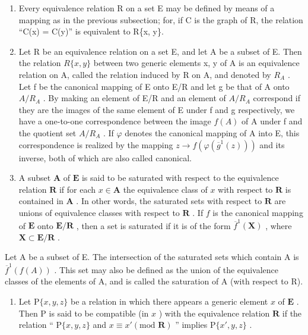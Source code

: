 \begin{enumerate}
\def\labelenumi{\arabic{enumi}.}
\setcounter{enumi}{3}
\item
  Every equivalence relation R on a set E may be defined by means of a mapping as in the previous subsection; for, if C is the graph of R, the relation ``C(x) = C(y)'' is equivalent to R\{x, y\}.
\item
  Let R be an equivalence relation on a set E, and let A be a subset of E. Then the relation \(R\{x, y\}\) between two generic elements x, y of A is an equivalence relation on A, called the relation induced by R on A, and denoted by \(R_{A}\) . Let f be the canonical mapping of E onto E/R and let g be that of A onto \(A/R_{A}\) . By making an element of E/R and an element of \(A/R_{A}\) correspond if they are the images of the same element of E under f and g respectively, we have a one-to-one correspondence between the image \(f(A)\) of A under f and the quotient set \(A/R_{A}\) . If \(\varphi\) denotes the canonical mapping of A into E, this correspondence is realized by the mapping \(z \to f(\varphi(\overline{g}^1(z)))\) and its inverse, both of which are also called canonical.
\item
  A subset \(\mathbf{A}\) of \(\mathbf{E}\) is said to be saturated with respect to the equivalence relation \(\mathbf{R}\) if for each \(x \in \mathbf{A}\) the equivalence class of \(x\) with respect to \(\mathbf{R}\) is contained in \(\mathbf{A}\) . In other words, the saturated sets with respect to \(\mathbf{R}\) are unions of equivalence classes with respect to \(\mathbf{R}\) . If \(f\) is the canonical mapping of \(\mathbf{E}\) onto \(\mathbf{E} / \mathbf{R}\) , then a set is saturated if it is of the form \(\overline{f}^1(\mathbf{X})\) , where \(\mathbf{X} \subset \mathbf{E} / \mathbf{R}\) .
\end{enumerate}

Let A be a subset of E. The intersection of the saturated sets which contain A is \(\overline{f}^{1}(f(A))\) . This set may also be defined as the union of the equivalence classes of the elements of A, and is called the saturation of A (with respect to R).

\begin{enumerate}
\def\labelenumi{\arabic{enumi}.}
\setcounter{enumi}{6}
\tightlist
\item
  Let \(\mathrm{P}\{x, y, z\}\) be a relation in which there appears a generic element \(x\) of \(\mathbf{E}\) . Then \(\mathrm{P}\) is said to be compatible (in \(x\) ) with the equivalence relation \(\mathbf{R}\) if the relation `` \(\mathrm{P}\{x, y, z\}\) and \(x \equiv x' (\text{mod } \mathbf{R})\) '' implies \(\mathrm{P}\{x', y, z\}\) .
\end{enumerate}

